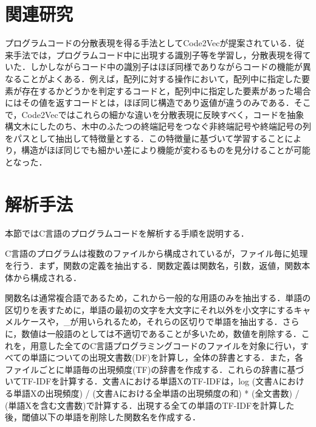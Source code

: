 \documentclass[submit,techrep,noauthor]{ipsj}
\begin{document}
\section{関連研究}

プログラムコードの分散表現を得る手法としてCode2Vec\cite{alon2019code2vec}が提案されている．従来手法では，プログラムコード中に出現する識別子等を学習し，分散表現を得ていた．しかしながらコード中の識別子はほぼ同様でありながらコードの機能が異なることがよくある．例えば，配列に対する操作において，配列中に指定した要素が存在するかどうかを判定するコードと，配列中に指定した要素があった場合にはその値を返すコードとは，ほぼ同じ構造であり返値が違うのみである．そこで，Code2Vecではこれらの細かな違いを分散表現に反映すべく，コードを抽象構文木にしたのち、木中のふたつの終端記号をつなぐ非終端記号や終端記号の列をパスとして抽出して特徴量とする．この特徴量に基づいて学習することにより，構造がほぼ同じでも細かい差により機能が変わるものを見分けることが可能となった．

\section{解析手法}

本節ではC言語のプログラムコードを解析する手順を説明する．

C言語のプログラムは複数のファイルから構成されているが，ファイル毎に処理を行う．まず，関数の定義を抽出する．関数定義は関数名，引数，返値，関数本体から構成される．

関数名は通常複合語であるため，これから一般的な用語のみを抽出する．単語の区切りを表すために，単語の最初の文字を大文字にそれ以外を小文字にするキャメルケースや，\_が用いられるため，それらの区切りで単語を抽出する．さらに，数値は一般語のとしては不適切であることが多いため，数値を削除する．これを，用意した全てのC言語プログラミングコードのファイルを対象に行い，すべての単語についての出現文書数(DF)を計算し，全体の辞書とする．また，各ファイルごとに単語毎の出現頻度(TF)の辞書を作成する．これらの辞書に基づいてTF-IDFを計算する．文書Aにおける単語XのTF-IDFは，{log (文書Aにおける単語Xの出現頻度) / (文書Aにおける全単語の出現頻度の和)} * {(全文書数) / (単語Xを含む文書数)}で計算する．出現する全ての単語のTF-IDFを計算した後，閾値以下の単語を削除した関数名を作成する．
\end{document}
